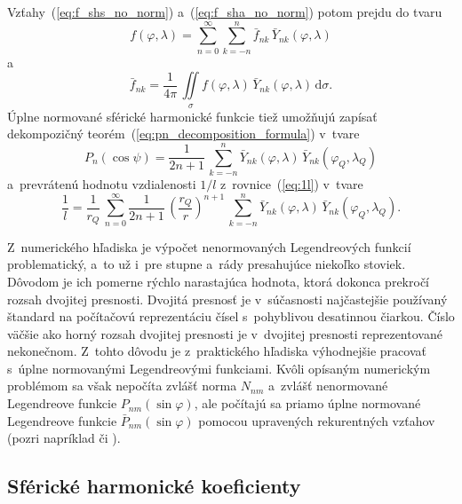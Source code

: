 \documentclass[a4paper,12pt]{book}
\newcommand{\diff}{\mathrm d}
\begin{document}
Vzťahy~(\ref{eq:f_shs_no_norm}) a~(\ref{eq:f_sha_no_norm}) potom prejdu do
tvaru
%
\begin{equation}
\label{eq:f_shs}
f(\varphi, \lambda) = \sum_{n = 0}^\infty \sum_{k = -n}^n \bar{f}_{nk} \,
\bar{Y}_{nk}(\varphi, \lambda)
\end{equation}
%
a
%
\begin{equation}
\label{eq:f_sha}
\bar{f}_{nk} = \frac{1}{4\pi} \, \iint\limits_{\sigma} f(\varphi, \lambda) \,
\bar{Y}_{nk}(\varphi, \lambda) \, \diff \sigma{.}
\end{equation}
%
Úplne normované sférické harmonické funkcie tiež umožňujú zapísať dekompozičný
teorém~(\ref{eq:pn_decomposition_formula}) v~tvare
\parencite{MoritzPhysicalGeodesy}
%
\begin{equation}
P_n(\cos\psi) = \frac{1}{2n + 1} \, \sum_{k = -n}^n \bar{Y}_{nk}(\varphi,
\lambda) \, \bar{Y}_{nk}(\varphi_Q, \lambda_Q)
\end{equation}
%
a~prevrátenú hodnotu vzdialenosti $1 \slash l$ z~rovnice~(\ref{eq:1l}) v~tvare
%
\begin{equation}
\label{eq:1l_sh}
\frac{1}{l} = \frac{1}{r_Q} \, \sum_{n = 0}^{\infty} \frac{1}{2n + 1} \, \left( 
\frac{r_Q}{r} \right)^{n + 1} \, \sum_{k = -n}^n \bar{Y}_{nk}(\varphi,
\lambda) \, \bar{Y}_{nk}(\varphi_Q, \lambda_Q){.}
\end{equation}
%

Z~numerického hľadiska je výpočet nenormovaných Legendreových funkcií 
problematický, a~to už i~pre stupne a~rády presahujúce niekoľko stoviek.  
Dôvodom je ich pomerne rýchlo narastajúca hodnota, ktorá dokonca prekročí 
rozsah dvojitej presnosti.  Dvojitá presnosť je v~súčasnosti najčastejšie 
používaný štandard na počítačovú reprezentáciu čísel s~pohyblivou desatinnou 
čiarkou.  Číslo väčšie ako horný rozsah dvojitej presnosti je v~dvojitej 
presnosti reprezentované nekonečnom.  Z~tohto dôvodu je z~praktického hľadiska 
výhodnejšie pracovať s~úplne normovanými Legendreovými funkciami.  Kvôli 
opísaným numerickým problémom sa však nepočíta zvlášť norma $N_{nm}$ a~zvlášť 
nenormované Legendreove funkcie $P_{nm}(\sin\varphi)$, ale počítajú sa priamo 
úplne normované Legendreove funkcie $\bar{P}_{nm}(\sin\varphi)$ pomocou 
upravených rekurentných vzťahov (pozri napríklad \cite{Holmes2002a} či 
\cite{Fukushima2012a}).



\subsection{Sférické harmonické koeficienty}
\label{sec:shc_norm}
\end{document}
